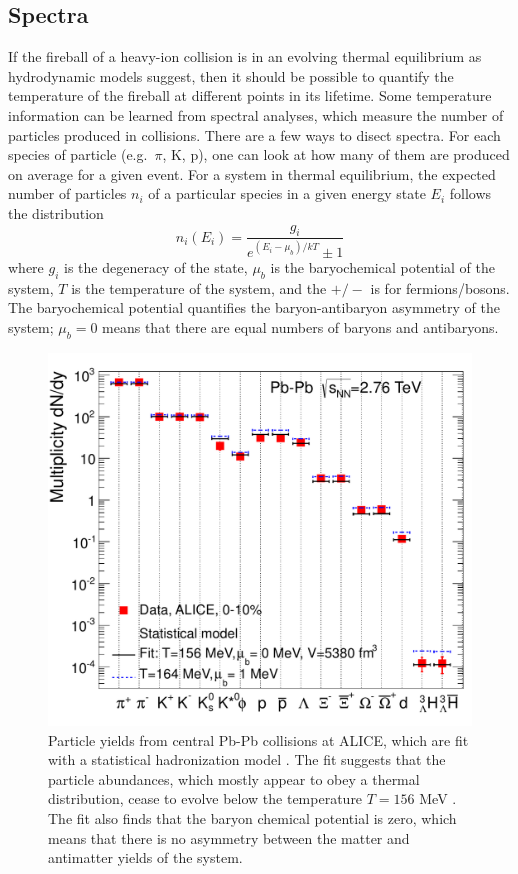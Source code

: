 \subsection{Spectra}

If the fireball of a heavy-ion collision is in an evolving thermal equilibrium as hydrodynamic models suggest, then it should be possible to quantify the temperature of the fireball at different points in its lifetime.
Some temperature information can be learned from spectral analyses, which measure the number of particles produced in collisions.
There are a few ways to disect spectra.
For each species of particle (e.g.\ $\pi$, K, p), one can look at how many of them are produced on average for a given event.
For a system in thermal equilibrium, the expected number of particles $n_i$ of a particular species in a given energy state $E_i$ follows the distribution
\begin{equation}
\label{eq:ThermalDistribution}
n_i(E_i) = \frac{g_i}{e^{(E_i - \mu_b)/kT} \pm 1}
\end{equation}
where $g_i$ is the degeneracy of the state, $\mu_b$ is the baryochemical potential of the system,  $T$ is the temperature of the system, and the  $+/-$ is for fermions/bosons. 
The baryochemical potential quantifies the baryon-antibaryon asymmetry of the system; $\mu_b = 0$ means that there are equal numbers of baryons and antibaryons.

\begin{figure}[hbtp]
\includegraphics[width=36pc]{Figures/BorrowedFigures/ALICEYieldsThermalFit.pdf}
\caption[Thermal fit of ALICE yields]{Particle yields from central Pb-Pb collisions at ALICE, which are fit with a statistical hadronization model \cite{Stachel:2013zma}. 
The fit suggests that the particle abundances, which mostly appear to obey a thermal distribution, cease to evolve below the temperature $T = 156$ MeV .
The fit also finds that the baryon chemical potential is zero, which means that there is no asymmetry between the matter and antimatter yields of the system. 
}
\label{fig:ThermalYieldFit}
\end{figure}

